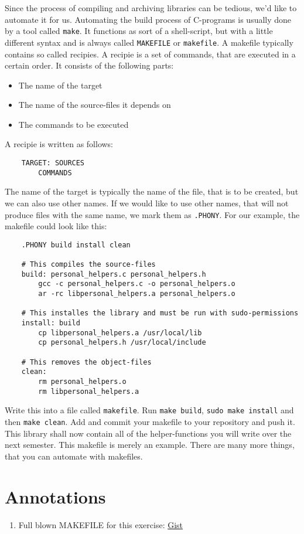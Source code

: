 \documentclass{dcbl/challenge}
\begin{document}
\begin{aufgabe}
    Since the process of compiling and archiving libraries can be tedious, we'd like to automate it for us.
    Automating the build process of C-programs is usually done by a tool called \texttt{make}.
    It functions as sort of a shell-script, but with a little different syntax and is always called \texttt{MAKEFILE} or \texttt{makefile}.
    A makefile typically contains so called recipies. 
    A recipie is a set of commands, that are executed in a certain order.
    It consists of the following parts:
    \begin{itemize}
        \item The name of the target
        \item The name of the source-files it depends on
        \item The commands to be executed
    \end{itemize}
    A recipie is written as follows:
    \begin{lstlisting}
    TARGET: SOURCES
        COMMANDS
    \end{lstlisting}
    The name of the target is typically the name of the file, that is to be created, but we can also use other names.
    If we would like to use other names, that will not produce files with the same name, we mark them as \texttt{.PHONY}.
    For our example, the makefile could look like this:
    \begin{lstlisting}
    .PHONY build install clean
    
    # This compiles the source-files
    build: personal_helpers.c personal_helpers.h
        gcc -c personal_helpers.c -o personal_helpers.o
        ar -rc libpersonal_helpers.a personal_helpers.o
    
    # This installes the library and must be run with sudo-permissions
    install: build
        cp libpersonal_helpers.a /usr/local/lib
        cp personal_helpers.h /usr/local/include
    
    # This removes the object-files
    clean:
        rm personal_helpers.o
        rm libpersonal_helpers.a
    \end{lstlisting}
    Write this into a file called \texttt{makefile}.
    Run \texttt{make build}, \texttt{sudo make install} and then \texttt{make clean}.
    Add and commit your makefile to your repository and push it.
    This library shall now contain all of the helper-functions you will write over the next semester.
    This makefile is merely an example. 
    There are many more things, that you can automate with makefiles.
\end{aufgabe}


\section*{Annotations}
\begin{enumerate}
    \item Full blown MAKEFILE for this exercise: \href{https://gist.github.com/bjoekeldude/738a19d7309a6cad95d4ae75f1b702a8}{Gist}
\end{enumerate}
\end{document}
